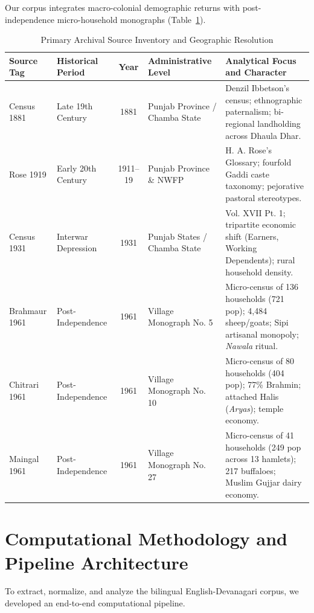 \documentclass[11pt,a4paper]{article}
\begin{document}
Our corpus integrates macro-colonial demographic returns with post-independence micro-household monographs (Table~\ref{tab:sources}).

\begin{table}[H]
\centering
\small
\caption{Primary Archival Source Inventory and Geographic Resolution}
\label{tab:sources}
\begin{tabularx}{\textwidth}{llcp{3.2cm}X}
\toprule
\textbf{Source Tag} & \textbf{Historical Period} & \textbf{Year} & \textbf{Administrative Level} & \textbf{Analytical Focus and Character} \\
\midrule
Census 1881 & Late 19th Century & 1881 & Punjab Province / Chamba State & Denzil Ibbetson's census; ethnographic paternalism; bi-regional landholding across Dhaula Dhar. \\
Rose 1919 & Early 20th Century & 1911--19 & Punjab Province \& NWFP & H. A. Rose's Glossary; fourfold Gaddi caste taxonomy; pejorative pastoral stereotypes. \\
Census 1931 & Interwar Depression & 1931 & Punjab States / Chamba State & Vol. XVII Pt. 1; tripartite economic shift (Earners, Working Dependents); rural household density. \\
Brahmaur 1961 & Post-Independence & 1961 & Village Monograph No. 5 & Micro-census of 136 households (721 pop); 4,484 sheep/goats; Sipi artisanal monopoly; \textit{Nawala} ritual. \\
Chitrari 1961 & Post-Independence & 1961 & Village Monograph No. 10 & Micro-census of 80 households (404 pop); 77\% Brahmin; attached Halis (\textit{Aryas}); temple economy. \\
Maingal 1961 & Post-Independence & 1961 & Village Monograph No. 27 & Micro-census of 41 households (249 pop across 13 hamlets); 217 buffaloes; Muslim Gujjar dairy economy. \\
\bottomrule
\end{tabularx}
\end{table}



\section{Computational Methodology and Pipeline Architecture}

To extract, normalize, and analyze the bilingual English-Devanagari corpus, we developed an end-to-end computational pipeline.
\end{document}
